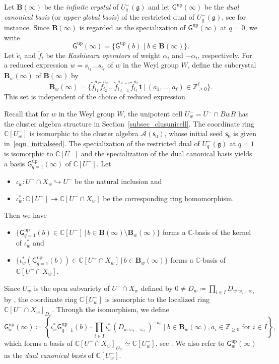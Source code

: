 \documentclass[11pt]{amsart}
\renewcommand{\tilde}{\widetilde}
\newcommand{\C}{\mathbb{C}}
\newcommand{\Z}{\mathbb{Z}}
\newcommand{\tf}{\tilde{f}}
\newcommand{\te}{\tilde{e}}
\def\mcal{\mathcal}
\numberwithin{equation}{section}
\theoremstyle{plain}
\theoremstyle{definition}
\numberwithin{equation}{section}
\newcommand{\seed}{\mathsf{s}}
\begin{document}
Let $\mathbf{B}(\infty)$ be the \emph{infinite crystal} of $U_q^-(\mathfrak{g})$ and let $\mathsf{G}^{\mathrm{up}}(\infty)$ be the \emph{dual canonical basis} (or \emph{upper global basis}) of the restricted dual of $U_q^-(\mathfrak{g})$, see \cite{KashiwaraBook, LusztigBook} for instance. Since $\textbf{B}(\infty)$ is regarded as the specialization of $\mathsf{G}^{\mathrm{up}}(\infty)$ at $q=0$, we write 
$$
\mathsf{G}^{\mathrm{up}}(\infty) = \{ \mathsf{G}^{\mathrm{up}}(b) \mid b\in \mathbf{B}(\infty) \}.
$$
Let $\te_i$ and $\tf_i$ be the \emph{Kashiwara operators} of weight $\alpha_i$ and $- \alpha_i$, respectively. For a reduced expression $w = s_{i_1} \dots s_{i_\ell}$ of $w$ in the Weyl group $W$, define the subcrystal $\mathbf B_w(\infty)$ of $\mathbf{B}(\infty)$ by
$$\mathbf B_w(\infty)
= \bigl\{\tf_{i_1}^{a_1} \tf_{i_2}^{a_2} \dots \tf_{i_{\ell-1}}^{a_{\ell-1}} \tf_{i_\ell}^{a_\ell} {\mathbf 1}\, \vert \, (a_1, \dots, a_\ell) \in \Z_{\ge 0}^\ell \bigr\}.
$$
This set is independent of the choice of reduced expression.

Recall that for $w$ in the Weyl group $W$, the unipotent cell $U_w^{-} = U^- \cap BwB$ has the cluster algebra structure in Section~\ref{subsec_clusunicell}. The coordinate ring $\C[U_w^{-}]$ is isomorphic to the cluster algebra $\mcal{A}(\seed_0)$, whose initial seed $\seed_0$ is given in~\eqref{equ_initialseed}. The specialization of the restricted dual of $U_q^-(\mathfrak{g})$ at $q=1$ is isomorphic to $\C[U^{-}]$ and the specialization of the dual canonical basis yields a basis $\mathsf{G}^{\mathrm{up}}_{q=1}(\infty)$ of $\C[U^{-}]$. Let
\begin{itemize}
\item 
$\iota_w \colon U^- \cap X_w \hookrightarrow U^-$ be the natural inclusion and 
\item 
$\iota_w^* \colon \C[U^-] \twoheadrightarrow \C[U^- \cap X_w]$
be the corresponding ring homomorphism. 
\end{itemize}
Then we have
\begin{itemize}
\item $\{ \mathsf{G}^{\mathrm{up}}_{q=1}(b) \in \C[U^-] \, \vert \,b \in \mathbf B(\infty) \setminus \mathbf B_w(\infty)\}$ forms a $\C$-basis of the kernel of $\iota_w^*$ and
\item $\{\iota_w^* (\mathsf{G}^{\mathrm{up}}_{q=1}(b)) \in \C[U^-\cap X_w] \, \vert \, b \in  \mathbf B_w(\infty)\} $ forms a $\C$-basis of $\C[U^-\cap X_w]$.
\end{itemize}

Since $U^-_w$ is the open subvariety of $U^- \cap X_w$ defined by $0 \neq D_w \coloneqq \prod_{i\in I}D_{w\varpi_i,\varpi_i}$ by \cite[Lemma 2.17]{KO21}, the coordinate ring $\C[U^-_w] $ is isomorphic to the localized ring $\C[U^- \cap X_w]_{D_w}$. Through the isomorphism, we define
$$
\mathsf{G}^{\mathrm{up}}_w(\infty) \coloneqq  \left\{ \iota_w^* \mathsf{G}^{\mathrm{up}}_{q=1}(b) \cdot {\prod_{i\in I} \iota_w^*(D_{w \varpi_i, \varpi_i})^{-a_i}} \mid b \in \textbf{B}_w(\infty),  a_i \in \Z_{\geq 0} \mbox{ for $i \in I$} \right\},
$$
which forms a basis of $\C[U^- \cap X_w]_{D_w}\simeq \C[U^-_w]$, see \cite[Theorem C.1]{FO25}. We also refer to $\mathsf{G}^{\mathrm{up}}_w(\infty)$ as the \emph{dual canonical basis} of $\C[U^-_w]$. 
\end{document}
